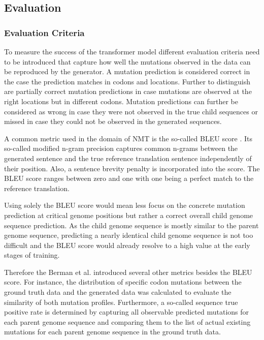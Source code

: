 \newpage
\subsection{Evaluation} \label{experimentsB}

\subsubsection{Evaluation Criteria} \label{experimentsBa}

To measure the success of the transformer model different evaluation criteria need to be introduced that capture how well the mutations observed in the data can be reproduced by the generator. A mutation prediction is considered correct in the case the prediction matches in codons and locations. Further to distinguish are partially correct mutation predictions in case mutations are observed at the right locations but in different codons. Mutation predictions can further be considered as wrong in case they were not observed in the true child sequences or missed in case they could not be observed in the generated sequences. 

A common metric used in the domain of \ac{NMT} is the so-called \ac{BLEU} score \cite{Papineni2002}. Its so-called modified n-gram precision captures common n-grams between the generated sentence and the true reference translation sentence independently of their position. Also, a sentence brevity penalty is incorporated into the score. The \ac{BLEU} score ranges between zero and one with one being a perfect match to the reference translation. \cite{Papineni2002}

Using solely the \ac{BLEU} score would mean less focus on the concrete mutation prediction at critical genome positions but rather a correct overall child genome sequence prediction. As the child genome sequence is mostly similar to the parent genome sequence, predicting a nearly identical child genome sequence is not too difficult and the \ac{BLEU} score would already resolve to a high value at the early stages of training. 

Therefore the Berman et al. \cite{Berman2020} introduced several other metrics besides the \ac{BLEU} score. For instance, the distribution of specific codon mutations between the ground truth data and the generated data was calculated to evaluate the similarity of both mutation profiles. Furthermore, a so-called sequence true positive rate is determined by capturing all observable predicted mutations for each parent genome sequence and comparing them to the list of actual existing mutations for each parent genome sequence in the ground truth data. 

